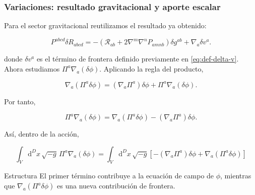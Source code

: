 \documentclass{beamer}
\newcommand{\Rcal}{\mathcal{R}}
\renewcommand{\dd}{\mathrm{d}}
\newcommand{\Eq}[1]{\eqref{#1}}
\begin{document}
\begin{frame}[label=nav-frame-075]
\frametitle{Variaciones: resultado gravitacional y aporte escalar}
\scriptsize

Para el sector gravitacional reutilizamos el resultado ya obtenido:

\begin{equation}
P^{abcd}\delta R_{abcd}
=
-\left(
\Rcal_{ab}
+
2\nabla^m\nabla^nP_{amnb}
\right)\delta g^{ab}
+
\nabla_a\delta v^a.
\label{eq:sector-gravitacional-generalizado}
\end{equation}

donde \(\delta v^a\) es el término de frontera definido previamente
en \Eq{eq:def-delta-v}. Ahora estudiamos $\Pi^a\nabla_a(\delta\phi)$. Aplicando la regla del producto,

\[
\nabla_a(\Pi^a\delta\phi)
=
(\nabla_a\Pi^a)\delta\phi
+
\Pi^a\nabla_a(\delta\phi).
\]

Por tanto,

\begin{equation}
\boxed{
\Pi^a\nabla_a(\delta\phi)
=
\nabla_a(\Pi^a\delta\phi)
-
(\nabla_a\Pi^a)\delta\phi.
}
\label{eq:integracion-partes-escalar}
\end{equation}

Así, dentro de la acción,

\[
\int_V\dd^Dx\,\sqrt{-g}\,
\Pi^a\nabla_a(\delta\phi)
=
\int_V\dd^Dx\,\sqrt{-g}
\left[
-(\nabla_a\Pi^a)\delta\phi
+
\nabla_a(\Pi^a\delta\phi)
\right]
\]

\begin{block}{Estructura}
El primer término contribuye a la ecuación de campo de \(\phi\),
mientras que $\nabla_a(\Pi^a\delta\phi)$ es una nueva contribución de frontera.
\end{block}

\end{frame}
\end{document}
